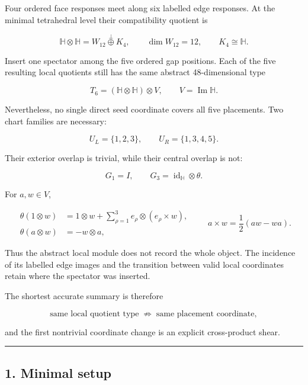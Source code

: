 \documentclass[
  11pt,
  a4paper,
]{article}
\begin{document}
Four ordered face responses meet along six labelled edge responses. At
the minimal tetrahedral level their compatibility quotient is

\[
\mathbb H\otimes\mathbb H
=
W_{12}\mathbin{\overset\perp\oplus}K_4,
\qquad
\dim W_{12}=12,
\qquad
K_4\cong\mathbb H.
\tag{0.1}
\]

Insert one spectator among the five ordered gap positions. Each of the
five resulting local quotients still has the same abstract
48-dimensional type

\[
T_6=(\mathbb H\otimes\mathbb H)\otimes V,
\qquad V=\operatorname{Im}\mathbb H.
\tag{0.2}
\]

Nevertheless, no single direct seed coordinate covers all five
placements. Two chart families are necessary:

\[
U_L=\{1,2,3\},
\qquad
U_R=\{1,3,4,5\}.
\tag{0.3}
\]

Their exterior overlap is trivial, while their central overlap is not:

\[
G_1=I,
\qquad
G_3=\operatorname{id}_{\mathbb H}\otimes\theta.
\tag{0.4}
\]

For \(a,w\in V\),

\[
\boxed{
\begin{aligned}
\theta(1\otimes w)
&=1\otimes w+
\sum_{\rho=1}^{3}e_\rho\otimes(e_\rho\times w),\\
\theta(a\otimes w)&=-w\otimes a,
\end{aligned}}
\qquad
a\times w=\frac12(aw-wa).
\tag{0.5}
\]

Thus the abstract local module does not record the whole object. The
incidence of its labelled edge images and the transition between valid
local coordinates retain where the spectator was inserted.

The shortest accurate summary is therefore

\[
\boxed{
\text{same local quotient type}
\;\not\Rightarrow\;
\text{same placement coordinate},
}
\tag{0.6}
\]

and the first nontrivial coordinate change is an explicit cross-product
shear.

\begin{center}\rule{0.5\linewidth}{0.5pt}\end{center}

\hypertarget{minimal-setup}{%
\subsection{1. Minimal setup}\label{minimal-setup}}
\end{document}
